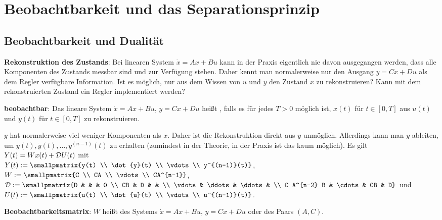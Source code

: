 \chapter{%
    Beobachtbarkeit und das Separationsprinzip%
}

\section{%
    Beobachtbarkeit und Dualität%
}

\textbf{Rekonstruktion des Zustands}:
Bei linearen System $\dot{x} = Ax + Bu$ kann in der Praxis eigentlich nie davon ausgegangen werden,
dass alle Komponenten des Zustands messbar sind und zur Verfügung stehen.
Daher kennt man normalerweise nur den Ausgang $y = Cx + Du$
als dem Regler verfügbare Information.
Ist es möglich, nur aus dem Wissen von $u$ und $y$ den Zustand $x$ zu rekonstruieren?
Kann mit dem rekonstruierten Zustand ein Regler implementiert werden?

\textbf{beobachtbar}:
Das lineare System $\dot{x} = Ax + Bu$, $y = Cx + Du$ heißt ,
falls es für jedes $T > 0$ möglich ist, $x(t)$ für $t \in [0, T]$ aus
$u(t)$ und $y(t)$ für $t \in [0, T]$ zu rekonstruieren.

\linie

$y$ hat normalerweise viel weniger Komponenten als $x$.
Daher ist die Rekonstruktion direkt aus $y$ unmöglich.
Allerdings kann man $y$ ableiten, um $y(t), \dot{y}(t), \dotsc, y^{(n-1)}(t)$ zu erhalten
(zumindest in der Theorie, in der Praxis ist das kaum möglich).
Es gilt $Y(t) = W x(t) + \mathcal{D} U(t)$ mit\\
$Y(t) := \smallpmatrix{y(t) \\ \dot{y}(t) \\ \vdots \\ y^{(n-1)}(t)}$,
$W := \smallpmatrix{C \\ CA \\ \vdots \\ CA^{n-1}}$,
$\D := \smallpmatrix{D & & & 0 \\ CB & D & & \\ \vdots & \ddots & \ddots & \\
C A^{n-2} B & \cdots & CB & D}$ und
$U(t) := \smallpmatrix{u(t) \\ \dot{u}(t) \\ \vdots \\ u^{(n-1)}(t)}$.

\textbf{Beobachtbarkeitsmatrix}:
$W$ heißt  des Systems
$\dot{x} = Ax + Bu$, $y = Cx + Du$
oder des Paars $(A, C)$.

